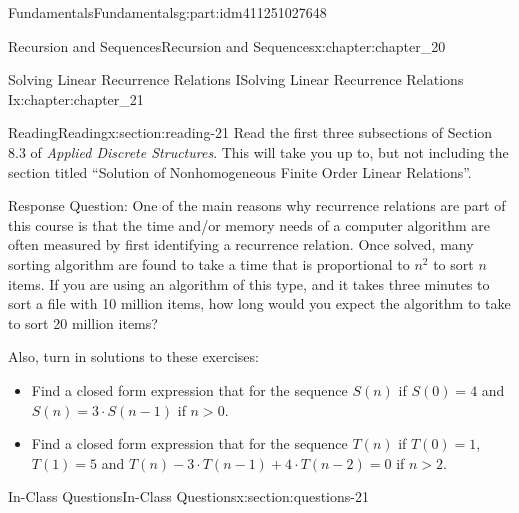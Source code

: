 \documentclass[oneside,10pt,]{book}
\numberwithin{equation}{section}
\newenvironment{codedisplay}
{\VerbatimEnvironment\begin{center}\begin{lrbox}{\codedisplaybox}\begin{BVerbatim}}
{\end{BVerbatim}\end{lrbox}\usebox{\codedisplaybox}\end{center}}
\newcommand{\gt}{>}
\begin{document}
\begin{partptx}{Fundamentals}{}{Fundamentals}{}{}{g:part:idm411251027648}
\begin{chapterptx}{Recursion and Sequences}{}{Recursion and Sequences}{}{}{x:chapter:chapter_20}
\end{chapterptx}
%
\typeout{************************************************}
\typeout{************************************************}
%
\begin{chapterptx}{Solving Linear Recurrence Relations I}{}{Solving Linear Recurrence Relations I}{}{}{x:chapter:chapter_21}
%
%
%
\typeout{************************************************}
\typeout{************************************************}
%
\begin{sectionptx}{Reading}{}{Reading}{}{}{x:section:reading-21}
Read the first three subsections of Section 8.3 of \emph{Applied Discrete Structures}.  This will take you up to, but not including the section titled ``Solution of Nonhomogeneous Finite Order Linear Relations''.%
\par
Response Question: One of the main reasons why recurrence relations are part of this course is that the time and\slash{}or memory needs of a computer algorithm are often measured by first identifying a recurrence relation.  Once solved, many sorting algorithm are found to take a time that is proportional to \(n^2\) to sort \(n\) items.  If you are using an algorithm of this type, and it takes three minutes to sort a file with 10 million items, how long would you expect the algorithm to take to sort 20 million items?%
\par
Also, turn in solutions to these exercises:%
\begin{itemize}[label=\textbullet]
\item{}Find a closed form expression that for the sequence \(S(n)\) if  \(S(0)=4\) and \(S(n)=3 \cdot S(n-1)\) if \(n \gt 0\).%
\item{}Find a closed form expression that for the sequence \(T(n)\) if  \(T(0)=1\), \(T(1)= 5\) and \(T(n)- 3\cdot T(n-1) + 4\cdot T(n-2)=0\) if \(n \gt 2\).%
\end{itemize}
%
\end{sectionptx}
%
%
\typeout{************************************************}
\typeout{************************************************}
%
\begin{sectionptx}{In-Class Questions}{}{In-Class Questions}{}{}{x:section:questions-21}
%
\begin{enumerate}[label=\arabic*.]

\end{enumerate}
\end{sectionptx}
\end{chapterptx}
\end{partptx}
\end{document}
